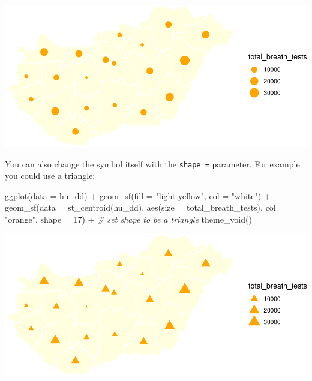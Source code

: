\documentclass[
]{book}
\makeatletter
\newenvironment{Shaded}{\begin{snugshade}}{\end{snugshade}}
\newcommand{\AttributeTok}[1]{\textcolor[rgb]{0.61,0.61,0.61}{#1}}
\newcommand{\CommentTok}[1]{\textcolor[rgb]{0.37,0.37,0.37}{\textit{#1}}}
\newcommand{\DecValTok}[1]{\textcolor[rgb]{0.06,0.06,0.06}{#1}}
\newcommand{\FunctionTok}[1]{\textcolor[rgb]{0,0,0}{#1}}
\newcommand{\NormalTok}[1]{#1}
\newcommand{\SpecialCharTok}[1]{\textcolor[rgb]{0,0,0}{#1}}
\newcommand{\StringTok}[1]{\textcolor[rgb]{0.5,0.5,0.5}{#1}}
\newenvironment{kframe}{%
\medskip{}
\setlength{\fboxsep}{.8em}
 \def\at@end@of@kframe{}%
 \ifinner\ifhmode%
  \def\at@end@of@kframe{\end{minipage}}%
  \begin{minipage}{\columnwidth}%
 \fi\fi%
 \def\FrameCommand##1{\hskip\@totalleftmargin \hskip-\fboxsep
 \colorbox{shadecolor}{##1}\hskip-\fboxsep
     \hskip-\linewidth \hskip-\@totalleftmargin \hskip\columnwidth}%
 \MakeFramed {\advance\hsize-\width
   \@totalleftmargin\z@ \linewidth\hsize
   \@setminipage}}%
 {\par\unskip\endMakeFramed%
 \at@end@of@kframe}
\renewenvironment{Shaded}{\begin{kframe}}{\end{kframe}}
\makeatother
\begin{document}
\includegraphics{crime_mapping_files/figure-latex/gradsymbmapcol-1.pdf}

You can also change the symbol itself with the \texttt{shape\ =} parameter. For example you could use a triangle:

\begin{Shaded}
\begin{Highlighting}[]
\FunctionTok{ggplot}\NormalTok{(}\AttributeTok{data =}\NormalTok{ hu\_dd) }\SpecialCharTok{+} 
  \FunctionTok{geom\_sf}\NormalTok{(}\AttributeTok{fill =} \StringTok{"light yellow"}\NormalTok{, }
          \AttributeTok{col =} \StringTok{"white"}\NormalTok{) }\SpecialCharTok{+} 
  \FunctionTok{geom\_sf}\NormalTok{(}\AttributeTok{data =} \FunctionTok{st\_centroid}\NormalTok{(hu\_dd), }
          \FunctionTok{aes}\NormalTok{(}\AttributeTok{size =}\NormalTok{ total\_breath\_tests), }
          \AttributeTok{col =} \StringTok{"orange"}\NormalTok{, }
          \AttributeTok{shape =} \DecValTok{17}\NormalTok{) }\SpecialCharTok{+} \CommentTok{\# set shape to be a triangle}
  \FunctionTok{theme\_void}\NormalTok{()}
\end{Highlighting}
\end{Shaded}

\includegraphics{crime_mapping_files/figure-latex/gradsymbmapcoltriangle-1.pdf}
\end{document}
